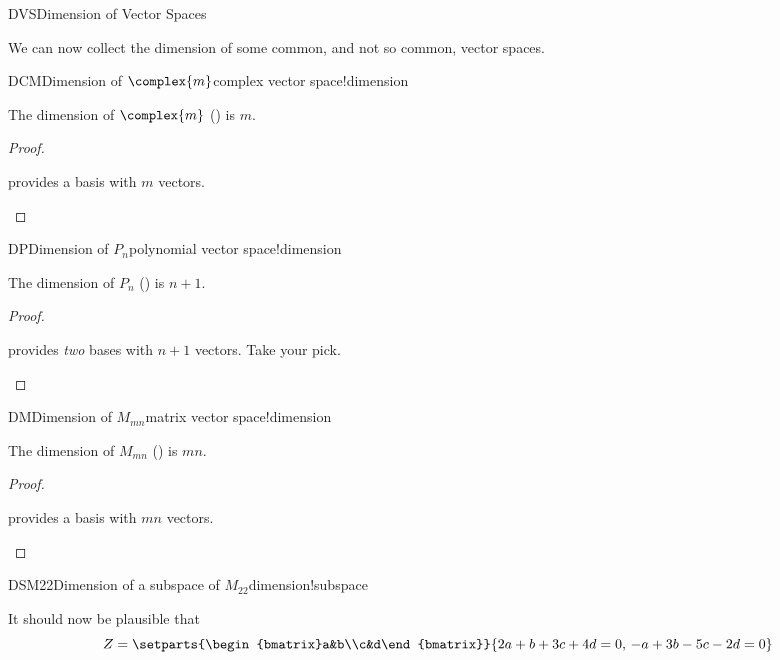 \begin{subsect}{DVS}{Dimension of Vector Spaces}
%
\begin{para}We can now collect the dimension of some common, and not so common, vector spaces.\end{para}
%
%
\begin{theorem}{DCM}{Dimension of $\complex{m}$}{complex vector space!dimension}
\begin{para}The dimension of $\complex{m}$ () is $m$.\end{para}
\end{theorem}
%
\begin{proof}
\begin{para} provides a basis with $m$ vectors.\end{para}
\end{proof}
%
\begin{theorem}{DP}{Dimension of $P_n$}{polynomial vector space!dimension}
\begin{para}The dimension of $P_{n}$  () is $n+1$.\end{para}
\end{theorem}
%
\begin{proof}
\begin{para} provides {\em two} bases with $n+1$ vectors.  Take your pick.\end{para}
\end{proof}
%
\begin{theorem}{DM}{Dimension of $M_{mn}$}{matrix vector space!dimension}
\begin{para}The dimension of $M_{mn}$  () is $mn$.\end{para}
\end{theorem}
%
\begin{proof}
\begin{para} provides a basis with $mn$ vectors.\end{para}
\end{proof}
%
\begin{example}{DSM22}{Dimension of a subspace of $M_{22}$}{dimension!subspace}
\begin{para}It should now be plausible that
%
\begin{equation*}
Z=\setparts{\begin{bmatrix}a&b\\c&d\end{bmatrix}}{2a+b+3c+4d=0,\,-a+3b-5c-2d=0}

\end{equation*}
\end{para}
\end{example}
\end{subsect}
